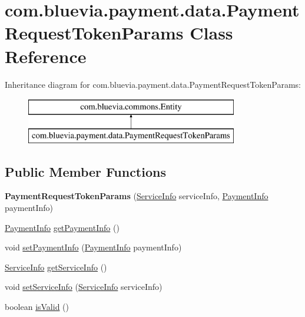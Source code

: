 \hypertarget{classcom_1_1bluevia_1_1payment_1_1data_1_1PaymentRequestTokenParams}{
\section{com.bluevia.payment.data.PaymentRequestTokenParams Class Reference}
\label{classcom_1_1bluevia_1_1payment_1_1data_1_1PaymentRequestTokenParams}
}
Inheritance diagram for com.bluevia.payment.data.PaymentRequestTokenParams:\begin{figure}[H]
\begin{center}
\leavevmode
\includegraphics[height=2.000000cm]{classcom_1_1bluevia_1_1payment_1_1data_1_1PaymentRequestTokenParams}
\end{center}
\end{figure}
\subsection*{Public Member Functions}
\begin{DoxyCompactItemize}
\item 
\hypertarget{classcom_1_1bluevia_1_1payment_1_1data_1_1PaymentRequestTokenParams_ac7c76dcfae85ed3452d48dfef2f73daf}{
{\bfseries PaymentRequestTokenParams} (\hyperlink{classcom_1_1bluevia_1_1payment_1_1data_1_1ServiceInfo}{ServiceInfo} serviceInfo, \hyperlink{classcom_1_1bluevia_1_1payment_1_1data_1_1PaymentInfo}{PaymentInfo} paymentInfo)}
\label{classcom_1_1bluevia_1_1payment_1_1data_1_1PaymentRequestTokenParams_ac7c76dcfae85ed3452d48dfef2f73daf}

\item 
\hyperlink{classcom_1_1bluevia_1_1payment_1_1data_1_1PaymentInfo}{PaymentInfo} \hyperlink{classcom_1_1bluevia_1_1payment_1_1data_1_1PaymentRequestTokenParams_aad3ad50d0af3a894e051e778243664d0}{getPaymentInfo} ()
\item 
void \hyperlink{classcom_1_1bluevia_1_1payment_1_1data_1_1PaymentRequestTokenParams_ae0cda5d12485b706de212488bfe1f7fd}{setPaymentInfo} (\hyperlink{classcom_1_1bluevia_1_1payment_1_1data_1_1PaymentInfo}{PaymentInfo} paymentInfo)
\item 
\hyperlink{classcom_1_1bluevia_1_1payment_1_1data_1_1ServiceInfo}{ServiceInfo} \hyperlink{classcom_1_1bluevia_1_1payment_1_1data_1_1PaymentRequestTokenParams_ae763357a970b8d9a3af1e2681b84034a}{getServiceInfo} ()
\item 
void \hyperlink{classcom_1_1bluevia_1_1payment_1_1data_1_1PaymentRequestTokenParams_af26f11e2d495d295d57a810171c98a8c}{setServiceInfo} (\hyperlink{classcom_1_1bluevia_1_1payment_1_1data_1_1ServiceInfo}{ServiceInfo} serviceInfo)
\item 
boolean \hyperlink{classcom_1_1bluevia_1_1payment_1_1data_1_1PaymentRequestTokenParams_a322ebaca09f578b7aa3745b2736a30f5}{isValid} ()
\end{DoxyCompactItemize}


